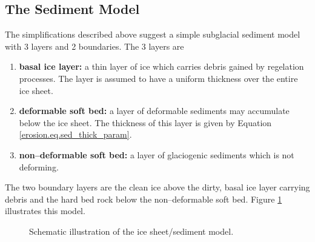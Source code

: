 \subsection{The Sediment Model}
The simplifications described above suggest a simple subglacial sediment model with 3 layers and 2 boundaries. The 3 layers are
\begin{enumerate}
\item \textbf{basal ice layer:} a thin layer of ice which carries debris gained
by regelation processes. The layer is assumed to have a uniform thickness over the entire ice sheet.
\item \textbf{deformable soft bed:} a layer of deformable sediments may accumulate below the ice sheet. The thickness of this layer is given by Equation \eqref{erosion.eq.sed_thick_param}.
\item \textbf{non--deformable soft bed:} a layer of glaciogenic sediments which is not deforming.
\end{enumerate}
The two boundary layers are the clean ice above the dirty, basal ice layer carrying debris and the hard bed rock below the non--deformable soft bed. Figure \ref{erosion.fig.ice_sed_model} illustrates this model.

\begin{figure}[htbp]
  \centering
  
  \caption{Schematic illustration of the ice sheet/sediment model.}
  \label{erosion.fig.ice_sed_model}
\end{figure}


